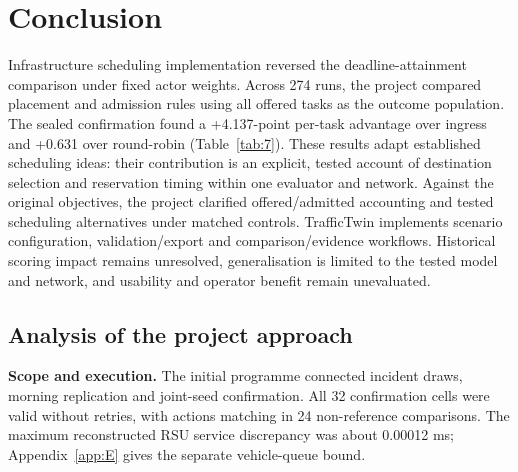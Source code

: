 \documentclass[12pt,a4paper]{article}
\begin{document}
\section{Conclusion}\label{sec:4}

Infrastructure scheduling implementation reversed the deadline-attainment comparison under fixed actor weights. Across 274 runs, the project compared placement and admission rules using all offered tasks as the outcome population. The sealed confirmation found a +4.137-point per-task advantage over ingress and +0.631 over round-robin (Table~\ref{tab:7}). These results adapt established scheduling ideas: their contribution is an explicit, tested account of destination selection and reservation timing within one evaluator and network. Against the original objectives, the project clarified offered/admitted accounting and tested scheduling alternatives under matched controls. TrafficTwin implements scenario configuration, validation/export and comparison/evidence workflows. Historical scoring impact remains unresolved, generalisation is limited to the tested model and network, and usability and operator benefit remain unevaluated.







\FloatBarrier
\subsection{Analysis of the project approach}\label{sec:4.1}

\textbf{Scope and execution.} The initial programme connected incident draws, morning replication and joint-seed confirmation. All 32 confirmation cells were valid without retries, with actions matching in 24 non-reference comparisons. The maximum reconstructed RSU service discrepancy was about 0.00012 ms; Appendix~\ref{app:E} gives the separate vehicle-queue bound.

\end{document}
